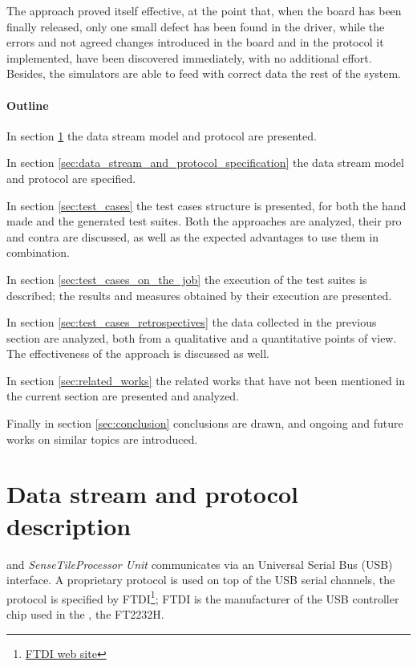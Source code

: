 \documentclass{article} \usepackage{times}
\newcommand{\myhref}[2]{\ifpdf\href{#1}{#2}\else\htmladdnormallinkfoot{#2}{#1}\fi}
\newcommand{\ST}{\emph{SenseTile}\xspace}
\newcommand{\STPU}{\ST \emph{Processor Unit}\xspace}
\begin{document}
The approach proved itself effective, at the point that, when the
board has been finally released, only one small defect has been found
in the driver, while the errors and not agreed changes introduced in
the board and in the protocol it implemented, have been discovered
immediately, with no additional effort.  Besides, the simulators are
able to feed with correct data the rest of the system.

\paragraph*{Outline}

In section \ref{sec:data_stream_and_protocol_description} the data
stream model and protocol are presented.

In section \ref{sec:data_stream_and_protocol_specification} the data
stream model and protocol are specified.

In section \ref{sec:test_cases} the test cases structure is presented,
for both the hand made and the generated test suites.  Both the
approaches are analyzed, their pro and contra are discussed, as well
as the expected advantages to use them in combination.

In section \ref{sec:test_cases_on_the_job} the execution of the test
suites is described; the results and measures obtained by their
execution are presented.

In section \ref{sec:test_cases_retrospectives} the data collected in
the previous section are analyzed, both from a qualitative and a
quantitative points of view. The effectiveness of the approach is
discussed as well.

In section \ref{sec:related_works} the related works that have not
been mentioned in the current section are presented and analyzed.

Finally in section \ref{sec:conclusion} conclusions are drawn, and
ongoing and future works on similar topics are introduced.



\section{Data stream and protocol description}
\label{sec:data_stream_and_protocol_description}

\STSB and \STPU communicates via an Universal Serial Bus (USB)
interface.  A proprietary protocol is used on top of the USB serial
channels, the protocol is specified by
FTDI\footnote{\myhref{http://www.ftdichip.com/}{FTDI web site}}; FTDI
is the manufacturer of the USB controller chip used in the \STSB, the
FT2232H\cite{ftdi_ft232h_2009}.
\end{document}
